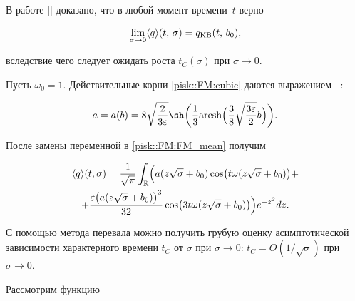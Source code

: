 \smallskip




В работе [] доказано, что в любой момент времени~$t$ верно

$$

\lim_{\sigma \to 0}\langle q\rangle (t,\,\sigma) = q_{\rm KB}(t,\, b_0),

$$

вследствие чего следует ожидать роста $t_{C}(\sigma)$ при $\sigma \to 0$.



Пусть $\omega_0 = 1$. Действительные корни \eqref{pisk::FM:cubic} даются выражением []:

$$

a=a(b) = 8\sqrt{\frac{2}{3\varepsilon}} \sh

\biggl(\frac 1 3 \text{arcsh} \Bigl(\dfrac 3 8

\sqrt{\frac{3\varepsilon}{2}} b\Bigr)\biggr).

$$

После замены переменной в \eqref{pisk::FM:FM_mean} получим

\begin{multline}

\label{pisk:after_sub}

\langle q\rangle(t,\sigma) =

\frac{1}{\sqrt{\pi}} \int_{\mathbb{R}}\Bigl(a(z\sqrt{\sigma} +

b_0)\cos\bigl(t\omega(z\sqrt{\sigma} + b_0)\bigr) +\\

+ \frac{\varepsilon \bigl(a(z\sqrt{\sigma} + b_0)\bigr)^3}{32}\cos\bigl(3t\omega(z\sqrt{\sigma} +

b_0)\bigr)\Bigr)e^{-z^2}dz.

\end{multline}

С помощью метода перевала можно получить грубую оценку асимптотической зависимости характерного времени $t_C$ от $\sigma$ при $\sigma\to 0$: $t_C = O(1/\sqrt{\sigma})$ при $\sigma\to 0$.



\smallskip




Рассмотрим функцию


